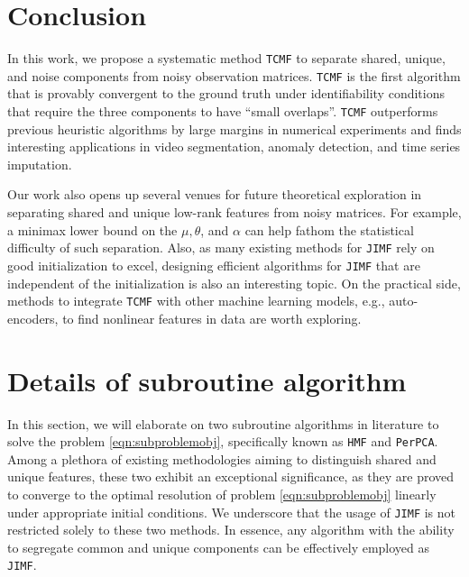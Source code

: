 \documentclass[twoside,11pt]{article}
\def\name{\texttt{TCMF}\xspace}
\def\inneralg{\texttt{JIMF}\xspace}
\def\perpca{\texttt{PerPCA}\xspace}
\def\hmf{\texttt{HMF}\xspace}
\begin{document}
\section{Conclusion} 
In this work, we propose a systematic method \name to separate shared, unique, and noise components from noisy observation matrices. \name is the first algorithm that is provably convergent to the ground truth under identifiability conditions that require the three components to have ``small overlaps''. \name outperforms previous heuristic algorithms by large margins in numerical experiments and finds interesting applications in video segmentation, anomaly detection, and time series imputation. 


Our work also opens up several venues for future theoretical exploration in separating shared and unique low-rank features from noisy matrices. For example, a minimax lower bound on the $\mu, \theta$, and $\alpha$ can help fathom the statistical difficulty of such separation. Also, as many existing methods for \inneralg rely on good initialization to excel, designing efficient algorithms for \inneralg that are independent of the initialization is also an interesting topic. On the practical side, methods to integrate \name with other machine learning models, e.g., auto-encoders, to find nonlinear features in data are worth exploring.





\newpage

\appendix
\section{Details of subroutine algorithm}

In this section, we will elaborate on two subroutine algorithms in literature to solve the problem \eqref{eqn:subproblemobj}, specifically known as \hmf and \perpca. Among a plethora of existing methodologies aiming to distinguish shared and unique features, these two exhibit an exceptional significance, as they are proved to converge to the optimal resolution of problem \eqref{eqn:subproblemobj} linearly under appropriate initial conditions. We underscore that the usage of \inneralg is not restricted solely to these two methods. In essence, any algorithm with the ability to segregate common and unique components can be effectively employed as \inneralg.
\end{document}
